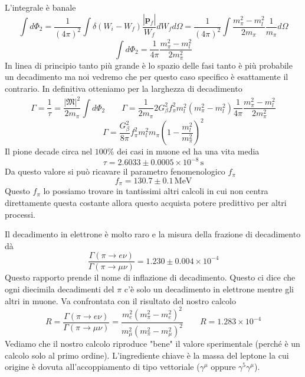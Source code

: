 L'integrale è banale
$$
\int d\Phi_2 = \frac{1}{(4\pi)^2} \int \delta(W_i - W_f) \frac{|\mathbf{p}_f|}{W_f} dW_f d\Omega = \frac{1}{(4\pi)^2} \int \frac{m_\pi^2 - m_l^2}{2m_\pi} \frac{1}{m_\pi} d\Omega
$$
$$
\int d\Phi_2 = \frac{1}{4\pi} \frac{m_\pi^2 - m_l^2}{2m_\pi^2}
$$
In linea di principio tanto più grande è lo spazio delle fasi tanto è più probabile un decadimento ma noi vedremo che per questo caso specifico è esattamente il contrario. In definitiva otteniamo per la larghezza di decadimento 
$$
\Gamma = \frac{1}{\tau} = \frac{\overline{|\mathfrak{M}|^2}}{2m_\pi} \int d\Phi_2 \qquad \Gamma = \frac{1}{2m_\pi} 2 G_\beta^2 f_\pi^2 m_l^2 (m_\pi^2 - m_l^2) \frac{1}{4\pi} \frac{m_\pi^2 - m_l^2}{2m_\pi^2}
$$
$$
\Gamma = \frac{G_\beta^2}{8\pi} f_\pi^2 m_l^2 m_\pi \left( 1 - \frac{m_l^2}{m_\pi^2} \right)^2
$$
Il pione decade circa nel $100\%$ dei casi in muone ed ha una vita media
$$
\tau = 2.6033 \pm 0.0005 \times 10^{-8} \, \text{s}
$$
Da questo valore si può ricavare il parametro fenomenologico $f_\pi$
$$
f_\pi = 130.7 \pm 0.1 \, \text{MeV}
$$
Questo $f_\pi$ lo possiamo trovare in tantissimi altri calcoli in cui non centra direttamente questa costante allora questo acquista potere predittivo per altri processi.

Il decadimento in elettrone è molto raro e la misura della frazione di decadimento dà
$$
\frac{\Gamma(\pi \to e\nu)}{\Gamma(\pi \to \mu\nu)} = 1.230 \pm 0.004 \times 10^{-4}
$$
Questo rapporto prende il nome di inflazione di decadimento. Questo ci dice che ogni diecimila decadimenti del $\pi$ c'è solo un decadimento in elettrone mentre gli altri in muone.
Va confrontata con il risultato del nostro calcolo
$$
R = \frac{\Gamma(\pi \to e\nu)}{\Gamma(\pi \to \mu\nu)} = \frac{m_e^2 (m_\pi^2 - m_e^2)^2}{m_\mu^2 (m_\pi^2 - m_\mu^2)^2} \quad \quad R = 1.283 \times 10^{-4}
$$
Vediamo che il nostro calcolo riproduce "bene" il valore sperimentale (perché è un calcolo solo al primo ordine). L'ingrediente chiave è la massa del leptone la cui origine è dovuta all'accoppiamento di tipo vettoriale ($\gamma^\mu$ oppure $\gamma^5\gamma^\mu$).
